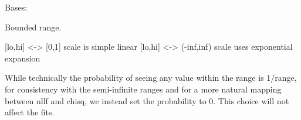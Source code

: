 \documentclass[letterpaper,10pt,english]{sphinxmanual}
\begin{document}
\begin{fulllineitems}
\label{api/mystic.bounds:refl1d.mystic.bounds.Bounded}
Bases: 

Bounded range.

{[}lo,hi{]} \textless{}-\textgreater{} {[}0,1{]} scale is simple linear
{[}lo,hi{]} \textless{}-\textgreater{} (-inf,inf) scale uses exponential expansion

While technically the probability of seeing any value within the
range is 1/range, for consistency with the semi-infinite ranges
and for a more natural mapping between nllf and chisq, we instead
set the probability to 0.  This choice will not affect the fits.

\begin{fulllineitems}
\label{api/mystic.bounds:refl1d.mystic.bounds.Bounded.get01}
\end{fulllineitems}


\begin{fulllineitems}
\label{api/mystic.bounds:refl1d.mystic.bounds.Bounded.getfull}
\end{fulllineitems}


\begin{fulllineitems}
\label{api/mystic.bounds:refl1d.mystic.bounds.Bounded.nllf}
\end{fulllineitems}


\begin{fulllineitems}
\label{api/mystic.bounds:refl1d.mystic.bounds.Bounded.put01}
\end{fulllineitems}


\begin{fulllineitems}
\label{api/mystic.bounds:refl1d.mystic.bounds.Bounded.putfull}
\end{fulllineitems}


\end{fulllineitems}
\end{document}
